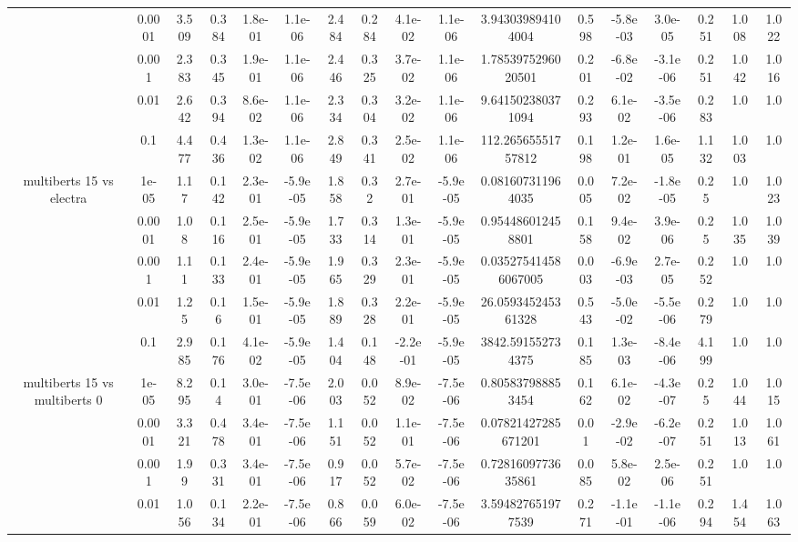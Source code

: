 \begin{tabular}{|c|c|c|c|c|c|c|c|c|c|c|c|c|c|c|c|c|}
 & 0.0001 & 3.509 & 0.384 & 1.8e-01 & 1.1e-06 & 2.484 & 0.284 & 4.1e-02 & 1.1e-06 & 3.943039894104004 & 0.598 & -5.8e-03 & 3.0e-05 & 0.251 & 1.008 & 1.022 \\
 & 0.001 & 2.383 & 0.345 & 1.9e-01 & 1.1e-06 & 2.446 & 0.325 & 3.7e-02 & 1.1e-06 & 1.7853975296020501 & 0.201 & -6.8e-02 & -3.1e-06 & 0.251 & 1.042 & 1.016 \\
 & 0.01 & 2.642 & 0.394 & 8.6e-02 & 1.1e-06 & 2.334 & 0.304 & 3.2e-02 & 1.1e-06 & 9.641502380371094 & 0.293 & 6.1e-02 & -3.5e-06 & 0.283 & 1.0 & 1.0 \\
 & 0.1 & 4.477 & 0.436 & 1.3e-02 & 1.1e-06 & 2.849 & 0.341 & 2.5e-02 & 1.1e-06 & 112.26565551757812 & 0.198 & 1.2e-01 & 1.6e-05 & 1.132 & 1.003 & 1.0 \\
\hline
\multirow{5}{*}{multiberts 15 vs electra } & 1e-05 & 1.17 & 0.142 & 2.3e-01 & -5.9e-05 & 1.858 & 0.32 & 2.7e-01 & -5.9e-05 & 0.081607311964035 & 0.005 & 7.2e-02 & -1.8e-05 & 0.25 & 1.0 & 1.023 \\
 & 0.0001 & 1.08 & 0.116 & 2.5e-01 & -5.9e-05 & 1.733 & 0.314 & 1.3e-01 & -5.9e-05 & 0.954486012458801 & 0.158 & 9.4e-02 & 3.9e-06 & 0.25 & 1.035 & 1.039 \\
 & 0.001 & 1.11 & 0.133 & 2.4e-01 & -5.9e-05 & 1.965 & 0.329 & 2.3e-01 & -5.9e-05 & 0.035275414586067005 & 0.003 & -6.9e-03 & 2.7e-05 & 0.252 & 1.0 & 1.0 \\
 & 0.01 & 1.25 & 0.16 & 1.5e-01 & -5.9e-05 & 1.889 & 0.328 & 2.2e-01 & -5.9e-05 & 26.059345245361328 & 0.543 & -5.0e-02 & -5.5e-06 & 0.279 & 1.0 & 1.0 \\
 & 0.1 & 2.985 & 0.176 & 4.1e-02 & -5.9e-05 & 1.404 & 0.148 & -2.2e-01 & -5.9e-05 & 3842.591552734375 & 0.185 & 1.3e-03 & -8.4e-06 & 4.199 & 1.0 & 1.0 \\
\hline
\multirow{5}{*}{multiberts 15 vs multiberts 0} & 1e-05 & 8.295 & 0.14 & 3.0e-01 & -7.5e-06 & 2.003 & 0.052 & 8.9e-02 & -7.5e-06 & 0.805837988853454 & 0.162 & 6.1e-02 & -4.3e-07 & 0.25 & 1.044 & 1.015 \\
 & 0.0001 & 3.321 & 0.478 & 3.4e-01 & -7.5e-06 & 1.151 & 0.052 & 1.1e-01 & -7.5e-06 & 0.07821427285671201 & 0.01 & -2.9e-02 & -6.2e-07 & 0.251 & 1.013 & 1.061 \\
 & 0.001 & 1.99 & 0.331 & 3.4e-01 & -7.5e-06 & 0.917 & 0.052 & 5.7e-02 & -7.5e-06 & 0.7281609773635861 & 0.085 & 5.8e-02 & 2.5e-06 & 0.251 & 1.0 & 1.0 \\
 & 0.01 & 1.056 & 0.134 & 2.2e-01 & -7.5e-06 & 0.866 & 0.059 & 6.0e-02 & -7.5e-06 & 3.594827651977539 & 0.271 & -1.1e-01 & -1.1e-06 & 0.294 & 1.454 & 1.063 \\

\end{tabular}
